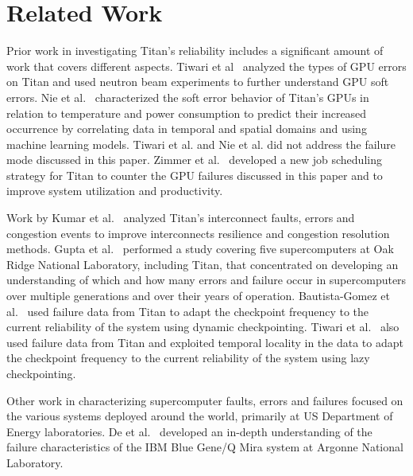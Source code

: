 \section{Related Work}
\label{sec:related}

Prior work in investigating Titan's reliability includes a significant amount of work that covers different aspects.
%
Tiwari et al~\cite{7056044} analyzed the types of GPU errors on Titan and used neutron beam experiments to further understand GPU soft errors.
%
Nie et al.~\cite{nie17characterizing,nie18machine} characterized the soft error behavior of Titan's GPUs in relation to temperature and power consumption to predict their increased occurrence by correlating data in temporal and spatial domains and using machine learning models.
%
Tiwari et al. and Nie et al. did not address the failure mode discussed in this paper.
%
Zimmer et al.~\cite{8665764} developed a new job scheduling strategy for Titan to counter the GPU failures discussed in this paper and to improve system utilization and productivity.


Work by Kumar et al.~\cite{kumar18understanding} analyzed Titan's interconnect faults, errors and congestion events to improve interconnects resilience and congestion resolution methods.
%
Gupta et al.~\cite{gupta17failures} performed a study covering five supercomputers at Oak Ridge National Laboratory, including Titan, that concentrated on developing an understanding of which and how many errors and failure occur in supercomputers over multiple generations and over their years of operation.
%
Bautista-Gomez et al.~\cite{bautista-gomez16reducing} used failure data from Titan to adapt the checkpoint frequency to the current reliability of the system using dynamic checkpointing.
%
Tiwari et al.~\cite{6903564} also used failure data from Titan and exploited temporal locality in the data to adapt the checkpoint frequency to the current reliability of the system using lazy checkpointing.

Other work in characterizing supercomputer faults, errors and failures focused on the various systems deployed around the world, primarily at US Department of Energy laboratories.
%
De et al.~\cite{8809553} developed an in-depth understanding of the failure characteristics of the IBM Blue Gene/Q Mira system at Argonne National Laboratory.